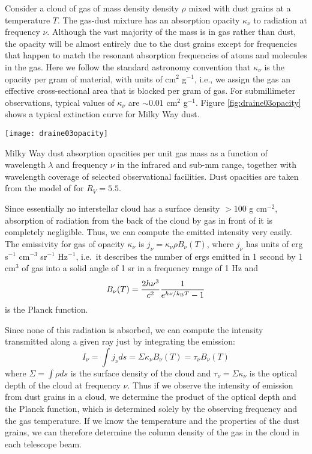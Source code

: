 Consider a cloud of gas of mass density density $\rho$ mixed with dust grains at a temperature $T$. The gas-dust mixture has an absorption opacity $\kappa_{\nu}$ to radiation at frequency $\nu$. Although the vast majority of the mass is in gas rather than dust, the opacity will be almost entirely due to the dust grains except for frequencies that happen to match the resonant absorption frequencies of atoms and molecules in the gas. Here we follow the standard astronomy convention that $\kappa_{\nu}$ is the opacity per gram of material, with units of cm$^2$ g$^{-1}$, i.e., we assign the gas an effective cross-sectional area that is blocked per gram of gas. For submillimeter observations, typical values of $\kappa_{\nu}$ are $\sim 0.01$ cm$^{2}$ g$^{-1}$. Figure \ref{fig:draine03opacity} shows a typical extinction curve for Milky Way dust.

\begin{marginfigure}
\texttt{[image: draine03opacity]}
\caption[Dust absorption opacity]{
\label{fig:draine03opacity}
Milky Way dust absorption opacities per unit gas mass as a function of wavelength $\lambda$ and frequency $\nu$ in the infrared and sub-mm range, together with wavelength coverage of selected observational facilities. Dust opacities are taken from the model of \citet{draine03a} for $R_V = 5.5$.
}
\end{marginfigure}

Since essentially no interstellar cloud has a surface density $> 100$ g cm$^{-2}$, absorption of radiation from the back of the cloud by gas in front of it is completely negligible. Thus, we can compute the emitted intensity very easily. The emissivity for gas of opacity $\kappa_{\nu}$ is $j_{\nu} = \kappa_{\nu} \rho B_{\nu}(T)$, where $j_{\nu}$ has units of erg s$^{-1}$ cm$^{-3}$ sr$^{-1}$ Hz$^{-1}$, i.e.\ it describes the number of ergs emitted in 1 second by 1 cm$^3$ of gas into a solid angle of 1 sr in a frequency range of 1 Hz and
\begin{equation}
B_{\nu}(T) = \frac{2 h\nu^3}{c^2} \frac{1}{e^{h\nu/k_{\mathrm{B}} T}-1}
\end{equation}
is the Planck function.
  
Since none of this radiation is absorbed, we can compute the intensity transmitted along a given ray just by integrating the emission: 
  \begin{equation}
  I_{\nu} = \int j_{\nu} ds = \Sigma \kappa_{\nu} B_{\nu}(T) = \tau_{\nu} B_{\nu}(T)
  \end{equation}
where $\Sigma=\int \rho ds$ is the surface density of the cloud and $\tau_{\nu} = \Sigma \kappa_{\nu}$ is the optical depth of the cloud at frequency $\nu$. Thus if we observe the intensity of emission from dust grains in a cloud, we determine the product of the optical depth and the Planck function, which is determined solely by the observing frequency and the gas temperature. If we know the temperature and the properties of the dust grains, we can therefore determine the column density of the gas in the cloud in each telescope beam.

